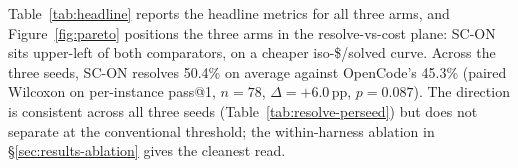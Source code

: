 \begin{table}[!tbp]
  \centering
  \caption{Headline metrics across the three arms (mean of seed means across three seeds).
    Acc@5 is View~B (agent-targeted); full tables ship in the released results database.
    Turns, tokens, and wall-clock are per-cell means on legit cells.}
  \label{tab:headline}
  
\end{table}

Table~\ref{tab:headline} reports the headline metrics for all three arms, and
Figure~\ref{fig:pareto} positions the three arms in the resolve-vs-cost plane: SC-ON
sits upper-left of both comparators, on a cheaper iso-\$/solved curve. Across the three
seeds, SC-ON resolves 50.4\% on average against OpenCode's 45.3\% (paired Wilcoxon on
per-instance pass@1, $n=78$, $\Delta=+6.0$\,pp, $p=0.087$). The direction is consistent
across all three seeds (Table~\ref{tab:resolve-perseed}) but does not separate at the
conventional threshold; the within-harness ablation in \S\ref{sec:results-ablation}
gives the cleanest read.

